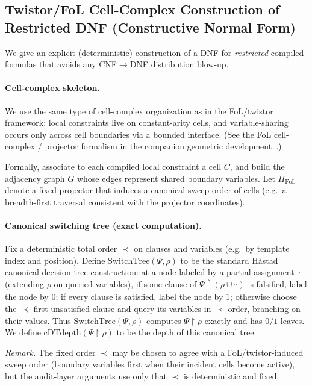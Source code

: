 \documentclass[12pt]{article}
\theoremstyle{definition}
\theoremstyle{definition}
\theoremstyle{remark}
\theoremstyle{remark}
\begin{document}
\subsection{Twistor/FoL Cell-Complex Construction of Restricted DNF (Constructive Normal Form)}
\label{subsec:twistor-constructed-restricted-dnf}

We give an explicit (deterministic) construction of a DNF for \emph{restricted} compiled formulas
that avoids any CNF$\to$DNF distribution blow-up.

\paragraph{Cell-complex skeleton.}
We use the same type of cell-complex organization as in the FoL/twistor framework:
local constraints live on constant-arity cells, and variable-sharing occurs only across
cell boundaries via a bounded interface. (See the FoL cell-complex / projector formalism in the
companion geometric development~\cite{edwards2025fol}.)

Formally, associate to each compiled local constraint a cell $C$, and build the adjacency graph
$G$ whose edges represent shared boundary variables.
Let $\Pi_{\mathrm{FoL}}$ denote a fixed projector that induces a canonical sweep order of cells
(e.g.\ a breadth-first traversal consistent with the projector coordinates).

\paragraph{Canonical switching tree (exact computation).}
Fix a deterministic total order $\prec$ on clauses and variables (e.g.\ by template index and position).
Define $\mathrm{SwitchTree}(\Psi,\rho)$ to be the standard H{\aa}stad canonical decision-tree
construction: at a node labeled by a partial assignment $\tau$ (extending $\rho$ on queried variables),
if some clause of $\Psi\!\upharpoonright\!(\rho\cup\tau)$ is falsified, label the node by $0$;
if every clause is satisfied, label the node by $1$; otherwise choose the $\prec$-first
unsatisfied clause and query its variables in $\prec$-order, branching on their values.
Thus $\mathrm{SwitchTree}(\Psi,\rho)$ computes $\Psi\!\upharpoonright\!\rho$ exactly and has $0/1$ leaves.
We define $\mathrm{cDTdepth}(\Psi\!\upharpoonright\!\rho)$ to be the depth of this canonical tree.

\emph{Remark.} The fixed order $\prec$ may be chosen to agree with a FoL/twistor-induced sweep
order (boundary variables first when their incident cells become active), but the audit-layer
arguments use only that $\prec$ is deterministic and fixed.
\end{document}
